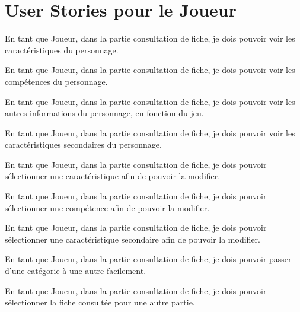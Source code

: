 \chapter{User Stories pour le Joueur}

En tant que Joueur, dans la partie consultation de fiche, je dois pouvoir voir
les caractéristiques du personnage.
~

En tant que Joueur, dans la partie consultation de fiche, je dois pouvoir voir
les compétences du personnage.
~

En tant que Joueur, dans la partie consultation de fiche, je dois pouvoir voir
les autres informations du personnage, en fonction du jeu.
~

En tant que Joueur, dans la partie consultation de fiche, je dois pouvoir voir
les caractéristiques secondaires du personnage.
~

En tant que Joueur, dans la partie consultation de fiche, je dois pouvoir
sélectionner une caractéristique afin de pouvoir la modifier.
~

En tant que Joueur, dans la partie consultation de fiche, je dois pouvoir
sélectionner une compétence afin de pouvoir la modifier.
~

En tant que Joueur, dans la partie consultation de fiche, je dois pouvoir
sélectionner une caractéristique secondaire afin de pouvoir la modifier.
~

En tant que Joueur, dans la partie consultation de fiche, je dois pouvoir
passer d'une catégorie à une autre facilement.
~

En tant que Joueur, dans la partie consultation de fiche, je dois pouvoir
sélectionner la fiche consultée pour une autre partie.
~


\clearpage
